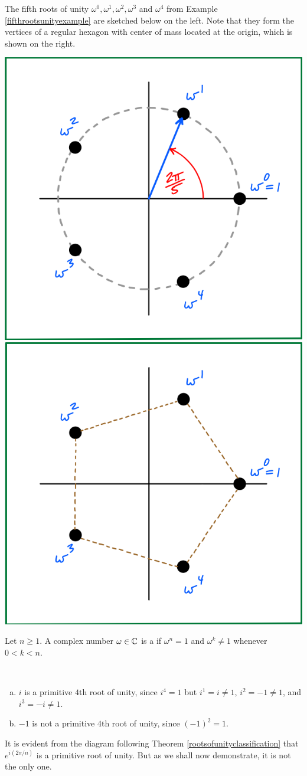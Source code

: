 \documentclass[11pt,fleqn,dvipsnames,usenames]{article}
\newcommand{\p}{\noindent}
\begin{document}
\p The fifth roots of unity $\omega^{0}, \omega^{1}, \omega^{2},\omega^{3}$ and $\omega^{4}$ from Example \ref{fifthrootsunityexample} are sketched below on the left.  Note that they form the vertices of a regular hexagon with center of mass located at the origin, which is shown on the right.

\begin{center}
\includegraphics[width=0.3\linewidth]{fifthrootsunity}\hspace{4cm} \includegraphics[width=0.3\linewidth]{fifthrootsunityhexagon}
\end{center}
%
\begin{definition} Let $n\geq 1$.  A complex number $\omega\in\mathbb{C}$ is a  if $\omega^{n} = 1$ and $\omega^{k}\neq 1$ whenever $0 < k < n$.
\end{definition}
%
\begin{examples}~
\begin{enumerate}[(a)]
\item $i$ is a primitive $4$th root of unity, since $i^{4} = 1$ but $i^{1} = i\neq 1$, $i^{2} = -1\neq 1$, and $i^3 = -i\neq 1$.
\item $-1$ is not a primitive $4$th root of unity, since $(-1)^2 = 1$.
\end{enumerate}
\end{examples}
%
\note It is evident from the diagram following Theorem \ref{rootsofunityclassification} that $e^{i(2\pi/n)}$ is a primitive root of unity.  But as we shall now demonstrate, it is not the only one.
\vsp
\end{document}
